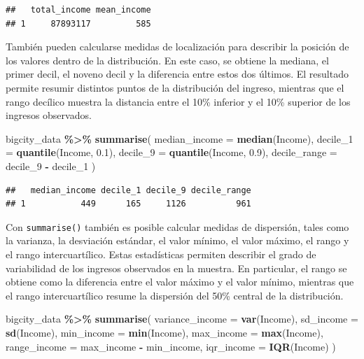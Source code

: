 \documentclass[
  spanish,
  12pt,
]{book}
\newenvironment{Shaded}{\begin{snugshade}}{\end{snugshade}}
\newcommand{\AttributeTok}[1]{\textcolor[rgb]{0.13,0.29,0.53}{#1}}
\newcommand{\FloatTok}[1]{\textcolor[rgb]{0.00,0.00,0.81}{#1}}
\newcommand{\FunctionTok}[1]{\textcolor[rgb]{0.13,0.29,0.53}{\textbf{#1}}}
\newcommand{\NormalTok}[1]{#1}
\newcommand{\SpecialCharTok}[1]{\textcolor[rgb]{0.81,0.36,0.00}{\textbf{#1}}}
\begin{document}
\begin{verbatim}
##   total_income mean_income
## 1     87893117         585
\end{verbatim}

También pueden calcularse medidas de localización para describir la posición de los valores dentro de la distribución. En este caso, se obtiene la mediana, el primer decil, el noveno decil y la diferencia entre estos dos últimos. El resultado permite resumir distintos puntos de la distribución del ingreso, mientras que el rango decílico muestra la distancia entre el 10\% inferior y el 10\% superior de los ingresos observados.

\begin{Shaded}
\begin{Highlighting}[]
\NormalTok{bigcity\_data }\SpecialCharTok{\%\textgreater{}\%}
  \FunctionTok{summarise}\NormalTok{(}
    \AttributeTok{median\_income =} \FunctionTok{median}\NormalTok{(Income),}
    \AttributeTok{decile\_1 =} \FunctionTok{quantile}\NormalTok{(Income, }\FloatTok{0.1}\NormalTok{),}
    \AttributeTok{decile\_9 =} \FunctionTok{quantile}\NormalTok{(Income, }\FloatTok{0.9}\NormalTok{),}
    \AttributeTok{decile\_range =}\NormalTok{ decile\_9 }\SpecialCharTok{{-}}\NormalTok{ decile\_1}
\NormalTok{  )}
\end{Highlighting}
\end{Shaded}

\begin{verbatim}
##   median_income decile_1 decile_9 decile_range
## 1           449      165     1126          961
\end{verbatim}

Con \texttt{summarise()} también es posible calcular medidas de dispersión, tales como la varianza, la desviación estándar, el valor mínimo, el valor máximo, el rango y el rango intercuartílico. Estas estadísticas permiten describir el grado de variabilidad de los ingresos observados en la muestra. En particular, el rango se obtiene como la diferencia entre el valor máximo y el valor mínimo, mientras que el rango intercuartílico resume la dispersión del 50\% central de la distribución.

\begin{Shaded}
\begin{Highlighting}[]
\NormalTok{bigcity\_data }\SpecialCharTok{\%\textgreater{}\%}
  \FunctionTok{summarise}\NormalTok{(}
    \AttributeTok{variance\_income =} \FunctionTok{var}\NormalTok{(Income),}
    \AttributeTok{sd\_income =} \FunctionTok{sd}\NormalTok{(Income),}
    \AttributeTok{min\_income =} \FunctionTok{min}\NormalTok{(Income),}
    \AttributeTok{max\_income =} \FunctionTok{max}\NormalTok{(Income),}
    \AttributeTok{range\_income =}\NormalTok{ max\_income }\SpecialCharTok{{-}}\NormalTok{ min\_income,}
    \AttributeTok{iqr\_income =} \FunctionTok{IQR}\NormalTok{(Income)}
\NormalTok{  )}
\end{Highlighting}
\end{Shaded}
\end{document}
